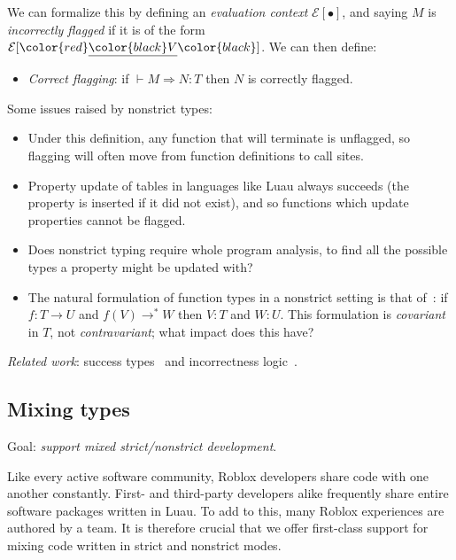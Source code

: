 \documentclass[acmsmall]{acmart}
\newcommand{\squnder}[1]{\color{red}\underline{{\color{black}#1}}\color{black}}
\newcommand{\evCtx}{\mathcal{E}}
\begin{document}
We can formalize this by defining an \emph{evaluation context}
$\evCtx[\bullet]$, and saying $M$ is \emph{incorrectly flagged}
if it is of the form $\evCtx[\squnder{V}]$. We can then define:
\begin{itemize}
\item \emph{Correct flagging}: if ${} \vdash M \Rightarrow N : T$
  then $N$ is correctly flagged.
\end{itemize}
Some issues raised by nonstrict types:
\begin{itemize}

\item Under this definition, any function that will terminate is unflagged, so
  flagging will often move from function definitions to call sites.

\item Property update of tables in languages like Luau always succeeds
  (the property is inserted if it did not exist), and so functions which
  update properties cannot be flagged.

\item Does nonstrict typing require whole program analysis,
  to find all the possible types a property might be updated with?

\item The natural formulation of function types in a nonstrict setting
  is that of~\cite{SuccessTyping}: if $f: T \rightarrow U$ and $f(V) \rightarrow^* W$
  then $V:T$ and $W:U$. This formulation is \emph{covariant} in $T$,
  not \emph{contravariant}; what impact does this have?
  
\end{itemize}
\emph{Related work}: success types~\cite{SuccessTyping} and incorrectness logic~\cite{IncorrectnessLogic}.

\subsection{Mixing types}

Goal: \emph{support mixed strict/nonstrict development}.

Like every active software community, Roblox developers share code
with one another constantly.  First- and third-party developers alike
frequently share entire software packages written in Luau.  To add to
this, many Roblox experiences are authored by a team.  It is therefore
crucial that we offer first-class support for mixing code written in
strict and nonstrict modes.
\end{document}
